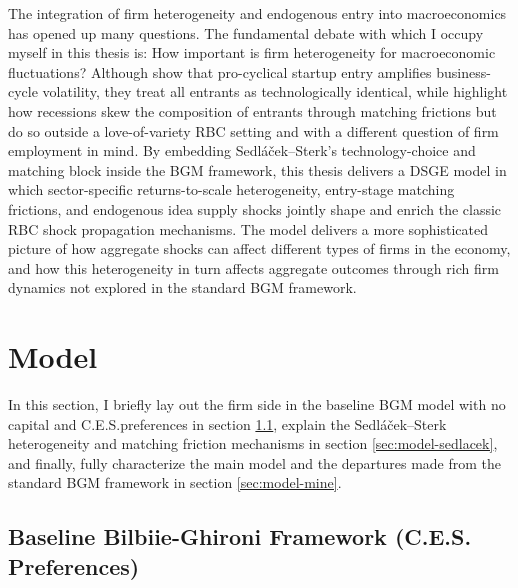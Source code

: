 \documentclass[a4paper,12pt]{article} %
\numberwithin{equation}{section} %
\numberwithin{figure}{section}
\numberwithin{table}{section}
\begin{document}
The integration of firm heterogeneity and endogenous entry into macroeconomics has opened up many questions. The fundamental debate with which I occupy myself
in this thesis is: How important is firm heterogeneity for macroeconomic fluctuations? Although \textcite{bilbiie2012endogenous} show that 
pro-cyclical startup entry amplifies business-cycle volatility, they treat all entrants as technologically identical, while \textcite{sedlavcek2017growth} 
highlight how recessions skew the composition of entrants through matching frictions but do so outside a love-of-variety RBC setting and with a different question of
firm employment in mind. By embedding Sedláček–Sterk’s technology-choice and matching block inside the BGM framework, 
this thesis delivers a DSGE model in which sector-specific returns-to-scale heterogeneity, entry-stage matching frictions, and endogenous idea supply shocks jointly shape 
and enrich the classic RBC shock propagation mechanisms. The model delivers a more sophisticated picture of how aggregate shocks can affect different types of firms in the economy, and
how this heterogeneity in turn affects aggregate outcomes through rich firm dynamics not explored in the standard BGM framework.


\section{Model}
\label{sec:model}

In this section, I briefly lay out the firm side in the baseline BGM model with no capital and C.E.S.preferences in section \ref{sec:model-bilbiie}, explain the Sedláček–Sterk
heterogeneity and matching friction mechanisms in section \ref{sec:model-sedlacek}, and finally, fully characterize the main model and the departures made
from the standard BGM framework in section \ref{sec:model-mine}. 

\subsection{Baseline Bilbiie-Ghironi Framework (C.E.S. Preferences)}
\label{sec:model-bilbiie}
\end{document}
